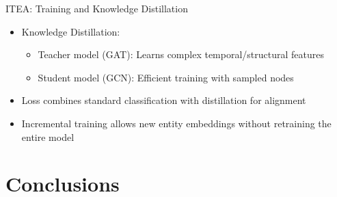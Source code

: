\documentclass{beamer}
\begin{document}
    \begin{frame}{ITEA: Training and Knowledge Distillation}
        \begin{itemize}
            \item Knowledge Distillation:
            \begin{itemize}
                \item Teacher model (GAT): Learns complex temporal/structural features
                \item Student model (GCN): Efficient training with sampled nodes
            \end{itemize}
            \item Loss combines standard classification with distillation for alignment
            \item Incremental training allows new entity embeddings without retraining the entire model
        \end{itemize}
    \end{frame}

    
    \section{Conclusions}
    
\end{document}
